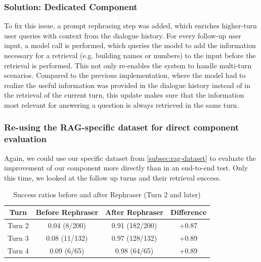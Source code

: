 \documentclass{article}
\begin{document}
\subsubsection*{Solution: Dedicated Component}

To fix this issue, a prompt rephrasing step was added, which enriches higher-turn user queries with context from the dialogue history. For every follow-up user input, a model call is performed, which queries the model to add the information necessary for a retrieval (e.g. building names or numbers) to the input before the retrieval is performed. This not only re-enables the system to handle multi-turn scenarios. Compared to the previous implementation, where the model had to realize the useful information was provided in the dialogue history instead of in the retrieval of the current turn, this update makes sure that the information most relevant for answering a question is always retrieved in the same turn.

\subsubsection*{Re-using the RAG-specific dataset for direct component evaluation}

Again, we could use our specific dataset from \ref{subsec:rag-dataset} to evaluate the improvement of our component more directly than in an end-to-end test. Only this time, we looked at the follow up turns and their retrieval success.

\begin{table}[H]
\centering
\begin{tabular}{|c|c|c|c|}
\hline
\textbf{Turn} & \textbf{Before Rephraser} & \textbf{After Rephraser} & \textbf{Difference} \\
\hline
Turn 2 & 0.04 (8/200) & 0.91 (182/200) & +0.87 \\
Turn 3 & 0.08 (11/132) & 0.97 (128/132) & +0.89 \\
Turn 4 & 0.09 (6/65) & 0.98 (64/65) & +0.89 \\
\hline
\end{tabular}
\caption{Success ratios before and after Rephraser (Turn 2 and later)}
\end{table}

\end{document}
